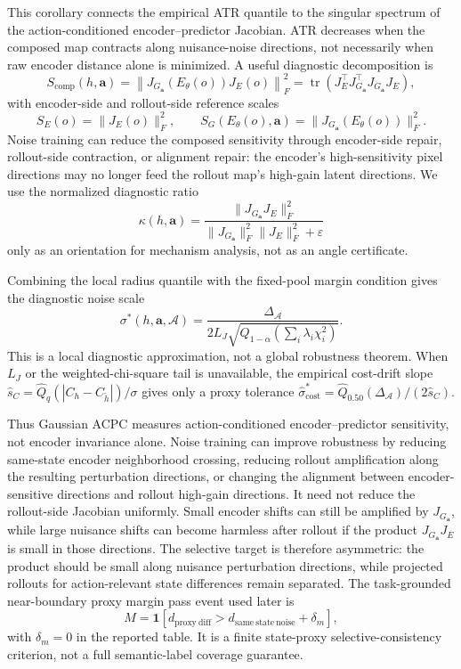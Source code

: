 \documentclass[10pt]{article}
\begin{document}
This corollary connects the empirical ATR quantile to the singular spectrum of the action-conditioned encoder--predictor Jacobian. ATR decreases when the composed map contracts along nuisance-noise directions, not necessarily when raw encoder distance alone is minimized. A useful diagnostic decomposition is
\[
S_{\mathrm{comp}}(h,\mathbf a)
=\left\|J_{G_{\mathbf a}}(E_\theta(o))J_E(o)\right\|_F^2
=\operatorname{tr}\!\left(J_E^\top J_{G_{\mathbf a}}^\top J_{G_{\mathbf a}}J_E\right),
\]
with encoder-side and rollout-side reference scales
\[
S_E(o)=\|J_E(o)\|_F^2,
\qquad
S_G(E_\theta(o),\mathbf a)=\|J_{G_{\mathbf a}}(E_\theta(o))\|_F^2.
\]
Noise training can reduce the composed sensitivity through encoder-side repair, rollout-side contraction, or alignment repair: the encoder's high-sensitivity pixel directions may no longer feed the rollout map's high-gain latent directions. We use the normalized diagnostic ratio
\[
\kappa(h,\mathbf a)
=
\frac{\|J_{G_{\mathbf a}}J_E\|_F^2}
{\|J_{G_{\mathbf a}}\|_F^2\|J_E\|_F^2+\varepsilon}
\]
only as an orientation for mechanism analysis, not as an angle certificate.

Combining the local radius quantile with the fixed-pool margin condition gives the diagnostic noise scale
\[
\sigma^*(h,\mathbf a,\mathcal A)
=
\frac{\Delta_{\mathcal A}}
{2L_J\sqrt{Q_{1-\alpha}(\sum_i\lambda_i\chi_i^2)}}.
\]
This is a local diagnostic approximation, not a global robustness theorem. When $L_J$ or the weighted-chi-square tail is unavailable, the empirical cost-drift slope $\widehat s_C=\widehat Q_q(|C_h-C_{\tilde h}|)/\sigma$ gives only a proxy tolerance $\widehat\sigma^*_{\mathrm{cost}}=\widehat Q_{0.50}(\Delta_{\mathcal A})/(2\widehat s_C)$.

Thus Gaussian ACPC measures action-conditioned encoder--predictor sensitivity, not encoder invariance alone. Noise training can improve robustness by reducing same-state encoder neighborhood crossing, reducing rollout amplification along the resulting perturbation directions, or changing the alignment between encoder-sensitive directions and rollout high-gain directions. It need not reduce the rollout-side Jacobian uniformly. Small encoder shifts can still be amplified by $J_{G_{\mathbf a}}$, while large nuisance shifts can become harmless after rollout if the product $J_{G_{\mathbf a}}J_E$ is small in those directions. The selective target is therefore asymmetric: the product should be small along nuisance perturbation directions, while projected rollouts for action-relevant state differences remain separated. The task-grounded near-boundary proxy margin pass event used later is
\[
M=\mathbf 1\!\left[d_{\mathrm{proxy\ diff}}>d_{\mathrm{same\ state\ noise}}+\delta_m\right],
\]
with $\delta_m=0$ in the reported table. It is a finite state-proxy selective-consistency criterion, not a full semantic-label coverage guarantee.
\end{document}
